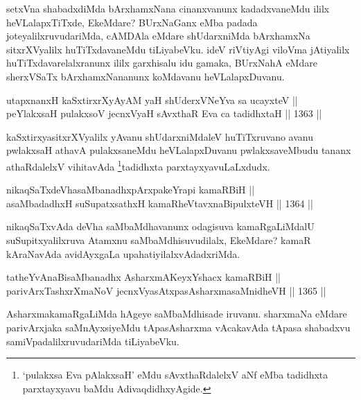 \begin{artha}
setxVna shabadxdiMda bArxhamxNana cinanxvanunx kadadxvaneMdu ililx heVLalapxTiTxde, EkeMdare? BUrxNaGanx eMba padada joteyalilxruvudariMda, cAMDAla eMdare shUdarxniMda bArxhamxNa sitxrXVyalilx huTiTxdavaneMdu tiLiyabeVku. ideV riVtiyAgi viloVma jAtiyalilx huTiTxdavarelalxranunx ililx garxhisalu idu gamaka, BUrxNahA eMdare sherxVSaTx bArxhamxNananunx koMdavanu heVLalapxDuvanu.
\end{artha}


\begin{shl}
utapxnanxH kaSxtirxrXyAyAM yaH shUderxVNeYva sa ucayxteV || \\
peYlakxsaH pulakxsoV jecnxVyaH sAvxthaR Eva ca tadidhxtaH \hfill || 1363 ||  
\end{shl}

\begin{artha}
kaSxtirxyasitxrXVyalilx yAvanu shUdarxniMdaleV huTiTxruvano avanu pwlakxsaH athavA pulakxsaneMdu heVLalapxDuvanu pwlakxsaveMbudu tananx athaRdalelxV vihitavAda \footnote{`pulakxsa Eva pAlakxsaH' eMdu sAvxthaRdalelxV aNf eMba tadidhxta parxtayxyavu baMdu AdivaqdidhxyAgide.}tadidhxta parxtayxyavuLaLxdudx.
\end{artha}

\begin{shl}
nikaqSaTxdeVhasaMbanadhxpArxpakeYrapi kamaRBiH || \\
asaMbadadhxH suSupatxsathxH kamaRheVtavxnaBipulxteVH \hfill || 1364 ||  
\end{shl}

\begin{artha}
nikaqSaTxvAda deVha saMbaMdhavanunx odagisuva kamaRgaLiMdalU suSupitxyalilxruva Atamxnu saMbaMdhisuvudilalx, EkeMdare? kamaR kAraNavAda avidAyxgaLa upahatiyilalxvAdadxriMda.
\end{artha}


\begin{shl}
tatheYvAnaBisaMbanadhx AsharxmAKeyxYshacx kamaRBiH || \\
parivArxTashxrXmaNoV jecnxVyasAtxpasAsharxmasaMnidheVH \hfill || 1365 ||  
\end{shl}

\begin{artha}
AsharxmakamaRgaLiMda hAgeye saMbaMdhisade iruvanu. sharxmaNa eMdare parivArxjaka saMnAyxsiyeMdu tApasAsharxma vAcakavAda tApasa shabadxvu samiVpadalilxruvudariMda tiLiyabeVku.
\end{artha}

